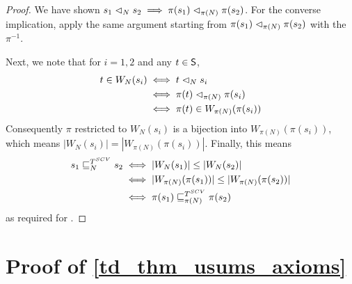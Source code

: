 \begin{proof}
We have shown $s_1 \scoh_N s_2 \implies \pi(s_1) \scoh_{\pi(N)} \pi(s_2)$. For
the converse implication, apply the same argument starting from $\pi(s_1)
\scoh_{\pi(N)} \pi(s_2)$ with the $\pi^{-1}$.

Next, we note that for $i=1, 2$ and any $t \in \S$,
\begin{align*}
    t \in W_N(s_i)
    & \iff t \scoh_N s_i \\
    & \iff \pi(t) \scoh_{\pi(N)} \pi(s_i) \\
    & \iff \pi(t) \in W_{\pi(N)}(\pi(s_i))
\end{align*}
Consequently $\pi$ restricted to $W_N(s_i)$ is a bijection into
$W_{\pi(N)}(\pi(s_i))$, which means $|W_N(s_i)| = |W_{\pi(N)}(\pi(s_i))|$.
Finally, this means
\begin{align*}
    s_1 \sle_N^{T^{SCV}} s_2
    & \iff |W_N(s_1)| \le |W_N(s_2)| \\
    & \iff |W_{\pi(N)}(\pi(s_1))| \le |W_{\pi(N)}(\pi(s_2))| \\
    & \iff \pi(s_1) \sle_{\pi(N)}^{T^{SCV}} \pi(s_2)
\end{align*}
as required for \symmetry{}.
\end{proof}

\section{Proof of \cref{td_thm_usums_axioms}}

